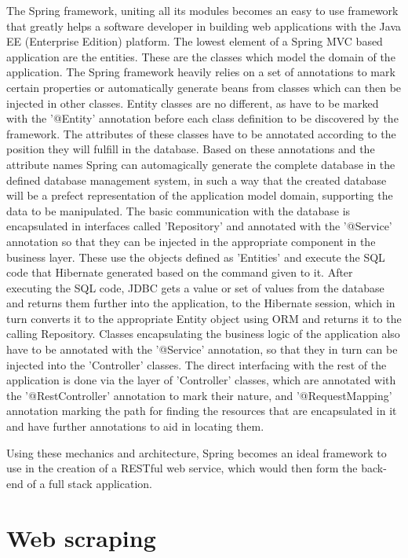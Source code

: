\documentclass[12pt,a4paper,twoside]{report}
\begin{document}
The Spring framework, uniting all its modules becomes an easy to use framework that greatly helps a software developer in building web applications with the Java EE (Enterprise Edition) platform. The lowest element of a Spring MVC based application are the entities. These are the classes which model the domain of the application. The Spring framework heavily relies on a set of annotations to mark certain properties or automatically generate beans from classes which can then be injected in other classes. Entity classes are no different, as have to be marked with the '@Entity' annotation before each class definition to be discovered by the framework. The attributes of these classes have to be annotated according to the position they will fulfill in the database. Based on these annotations and the attribute names Spring can automagically generate the complete database in the defined database management system, in such a way that the created database will be a prefect representation of the application model domain, supporting the data to be manipulated. The basic communication with the database is encapsulated in interfaces called 'Repository' and annotated with the '@Service' annotation so that they can be injected in the appropriate component in the business layer. These use the objects defined as 'Entities' and execute the SQL code that Hibernate generated based on the command given to it. After executing the SQL code, JDBC gets a value or set of values from the database and returns them further into the application, to the Hibernate session, which in turn converts it to the appropriate Entity object using ORM and returns it to the calling Repository. Classes encapsulating the business logic of the application also have to be annotated with the '@Service' annotation, so that they in turn can be injected into the 'Controller' classes. The direct interfacing with the rest of the application is done via the layer of 'Controller' classes, which are annotated with the '@RestController' annotation to mark their nature, and '@RequestMapping' annotation marking the path for finding the resources that are encapsulated in it and have further annotations to aid in locating them.

Using these mechanics and architecture, Spring becomes an ideal framework to use in the creation of a RESTful web service, which would then form the back-end of a full stack application.


\section{Web scraping}
\end{document}
